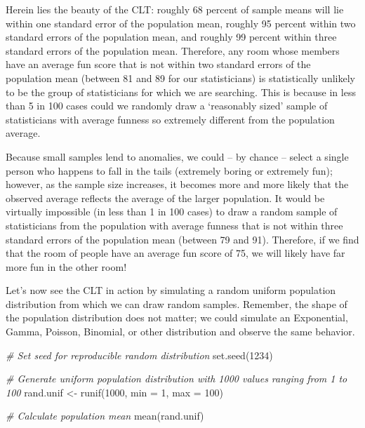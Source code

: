 \documentclass[
]{book}
\newenvironment{Shaded}{\begin{snugshade}}{\end{snugshade}}
\newcommand{\AttributeTok}[1]{\textcolor[rgb]{0.77,0.63,0.00}{#1}}
\newcommand{\CommentTok}[1]{\textcolor[rgb]{0.56,0.35,0.01}{\textit{#1}}}
\newcommand{\DecValTok}[1]{\textcolor[rgb]{0.00,0.00,0.81}{#1}}
\newcommand{\FunctionTok}[1]{\textcolor[rgb]{0.00,0.00,0.00}{#1}}
\newcommand{\NormalTok}[1]{#1}
\newcommand{\OtherTok}[1]{\textcolor[rgb]{0.56,0.35,0.01}{#1}}
\begin{document}
Herein lies the beauty of the CLT: roughly 68 percent of sample means will lie within one standard error of the population mean, roughly 95 percent within two standard errors of the population mean, and roughly 99 percent within three standard errors of the population mean. Therefore, any room whose members have an average fun score that is not within two standard errors of the population mean (between 81 and 89 for our statisticians) is statistically unlikely to be the group of statisticians for which we are searching. This is because in less than 5 in 100 cases could we randomly draw a `reasonably sized' sample of statisticians with average funness so extremely different from the population average.

Because small samples lend to anomalies, we could -- by chance -- select a single person who happens to fall in the tails (extremely boring or extremely fun); however, as the sample size increases, it becomes more and more likely that the observed average reflects the average of the larger population. It would be virtually impossible (in less than 1 in 100 cases) to draw a random sample of statisticians from the population with average funness that is not within three standard errors of the population mean (between 79 and 91). Therefore, if we find that the room of people have an average fun score of 75, we will likely have far more fun in the other room!

Let's now see the CLT in action by simulating a random uniform population distribution from which we can draw random samples. Remember, the shape of the population distribution does not matter; we could simulate an Exponential, Gamma, Poisson, Binomial, or other distribution and observe the same behavior.

\begin{Shaded}
\begin{Highlighting}[]
\CommentTok{\# Set seed for reproducible random distribution}
\FunctionTok{set.seed}\NormalTok{(}\DecValTok{1234}\NormalTok{)}

\CommentTok{\# Generate uniform population distribution with 1000 values ranging from 1 to 100}
\NormalTok{rand.unif }\OtherTok{\textless{}{-}} \FunctionTok{runif}\NormalTok{(}\DecValTok{1000}\NormalTok{, }\AttributeTok{min =} \DecValTok{1}\NormalTok{, }\AttributeTok{max =} \DecValTok{100}\NormalTok{)}
\end{Highlighting}
\end{Shaded}

\begin{Shaded}
\begin{Highlighting}[]
\CommentTok{\# Calculate population mean}
\FunctionTok{mean}\NormalTok{(rand.unif)}
\end{Highlighting}
\end{Shaded}
\end{document}
